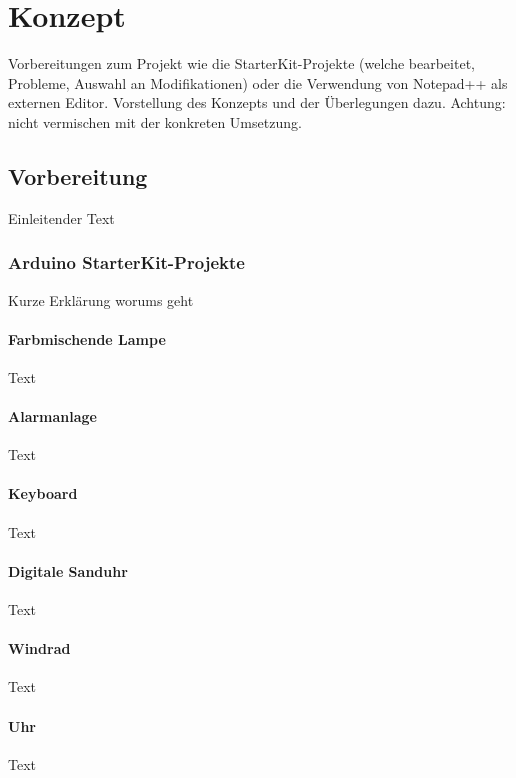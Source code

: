 \chapter{Konzept}

Vorbereitungen zum Projekt wie die StarterKit-Projekte (welche bearbeitet, Probleme, Auswahl an Modifikationen) oder die Verwendung von Notepad++ als externen Editor. Vorstellung des Konzepts und der Überlegungen dazu. Achtung: nicht vermischen mit der konkreten Umsetzung.

\section{Vorbereitung}
Einleitender Text
\subsection{Arduino StarterKit-Projekte}
Kurze Erklärung worums geht
\subsubsection{Farbmischende Lampe}
Text
\subsubsection{Alarmanlage}
Text
\subsubsection{Keyboard}
Text
\subsubsection{Digitale Sanduhr}
Text
\subsubsection{Windrad}
Text
\subsubsection{Uhr}
Text